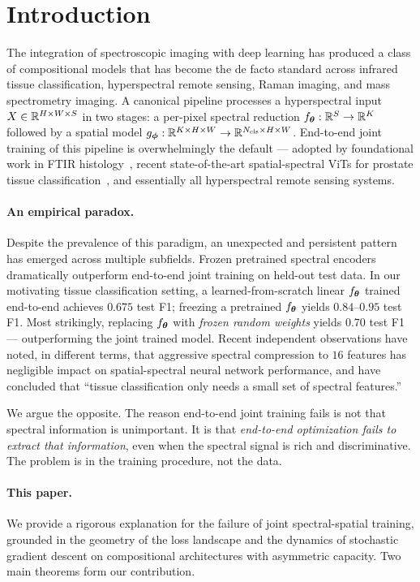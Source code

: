 \section{Introduction}
\label{sec:intro}

The integration of spectroscopic imaging with deep learning has produced
a class of compositional models that has become the de facto standard
across infrared tissue classification, hyperspectral remote sensing,
Raman imaging, and mass spectrometry imaging. A canonical pipeline
processes a hyperspectral input $X \in \mathbb{R}^{H \times W \times S}$ in two
stages: a per-pixel spectral reduction $f_{\boldsymbol{\theta}}: \mathbb{R}^S \to \mathbb{R}^K$
followed by a spatial model $g_{\boldsymbol{\phi}}: \mathbb{R}^{K \times H \times W} \to
\mathbb{R}^{N_{\mathrm{cls}} \times H \times W}$. End-to-end joint training of
this pipeline is overwhelmingly the default — adopted by foundational
work in FTIR histology~\cite{berisha2019deep}, recent state-of-the-art
spatial-spectral ViTs for prostate tissue
classification~\cite{oleary2026spatial}, and essentially all
hyperspectral remote sensing systems.

\paragraph{An empirical paradox.}
Despite the prevalence of this paradigm, an unexpected and persistent
pattern has emerged across multiple subfields. Frozen pretrained
spectral encoders dramatically outperform end-to-end joint training
on held-out test data. In our motivating tissue classification setting,
a learned-from-scratch linear $f_{\boldsymbol{\theta}}$ trained end-to-end achieves
$0.675$ test F1; freezing a pretrained $f_{\boldsymbol{\theta}}$ yields $0.84$--$0.95$
test F1. Most strikingly, replacing $f_{\boldsymbol{\theta}}$ with \emph{frozen
random weights} yields $0.70$ test F1 --- outperforming the joint
trained model. Recent independent observations
\cite{oleary2026spatial,berisha2019deep} have noted, in different
terms, that aggressive spectral compression to $16$ features has
negligible impact on spatial-spectral neural network performance, and
have concluded that ``tissue classification only needs a small set of
spectral features.''

We argue the opposite. The reason end-to-end joint training fails is
not that spectral information is unimportant. It is that
\emph{end-to-end optimization fails to extract that information}, even
when the spectral signal is rich and discriminative. The problem is in
the training procedure, not the data.

\paragraph{This paper.}
We provide a rigorous explanation for the failure of joint
spectral-spatial training, grounded in the geometry of the loss
landscape and the dynamics of stochastic gradient descent on
compositional architectures with asymmetric capacity. Two main
theorems form our contribution.

